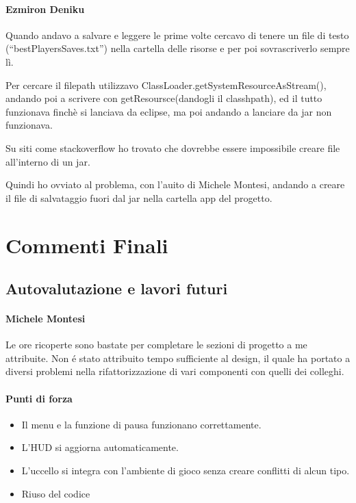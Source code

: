 \documentclass[a4paper,12pt]{report}
\begin{document}
\subsubsection{Ezmiron Deniku}
Quando andavo a salvare e leggere le prime volte cercavo di tenere un file di testo (“bestPlayersSaves.txt”) nella cartella delle risorse e per poi sovrascriverlo sempre lì.

Per cercare il filepath utilizzavo ClassLoader.getSystemResourceAsStream(), andando poi a scrivere con getResoursce(dandogli il classhpath), ed il tutto funzionava finchè si lanciava da eclipse, ma poi andando a lanciare da jar non funzionava.

Su siti come stackoverflow ho trovato che dovrebbe essere impossibile creare file all’interno di un jar.

Quindi ho ovviato al problema, con l’auito di Michele Montesi, andando a creare il file di salvataggio fuori dal jar nella cartella app del progetto.

\chapter{Commenti Finali}
\section{Autovalutazione e lavori futuri}
\subsubsection{Michele Montesi}
Le ore ricoperte sono bastate per completare le sezioni di progetto a me attribuite. Non é stato attribuito tempo sufficiente al design, il quale ha portato a diversi problemi nella rifattorizzazione di vari componenti con quelli dei colleghi. 

\subsubsection{Punti di forza}

\begin{itemize}
    \item Il menu e la funzione di pausa funzionano correttamente.
    \item L’HUD si aggiorna automaticamente.
    \item L’uccello si integra con l’ambiente di gioco senza creare conflitti di alcun tipo.
    \item Riuso del codice
\end{itemize}
\end{document}
